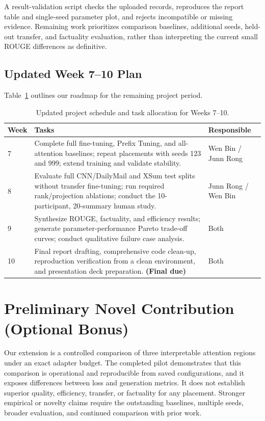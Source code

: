 \documentclass[11pt, letterpaper]{article}
\begin{document}
A result-validation script checks the uploaded records, reproduces the report
table and single-seed parameter plot, and rejects incompatible or missing evidence.
Remaining work prioritizes comparison baselines, additional seeds, held-out
transfer, and factuality evaluation, rather than interpreting the current small
ROUGE differences as definitive.

\subsection{Updated Week 7--10 Plan}
Table~\ref{tab:timeline} outlines our roadmap for the remaining project period.

\begin{table}[h]
\centering
\small
\begin{tabular}{@{}lp{8.8cm}l@{}}
\toprule
\textbf{Week} & \textbf{Tasks} & \textbf{Responsible} \\
\midrule
7 & Complete full fine-tuning, Prefix Tuning, and all-attention baselines; repeat placements with seeds 123 and 999; extend training and validate stability. & Wen Bin / Junn Rong \\
8 & Evaluate full CNN/DailyMail and XSum test splits without transfer fine-tuning; run required rank/projection ablations; conduct the 10-participant, 20-summary human study. & Junn Rong / Wen Bin \\
9 & Synthesize ROUGE, factuality, and efficiency results; generate parameter-performance Pareto trade-off curves; conduct qualitative failure case analysis. & Both \\
10 & Final report drafting, comprehensive code clean-up, reproduction verification from a clean environment, and presentation deck preparation. \textbf{(Final due)} & Both \\
\bottomrule
\end{tabular}
\caption{Updated project schedule and task allocation for Weeks 7--10.}
\label{tab:timeline}
\end{table}

\section{Preliminary Novel Contribution (Optional Bonus)}
Our extension is a controlled comparison of three interpretable attention regions
under an exact adapter budget. The completed pilot demonstrates that this comparison
is operational and reproducible from saved configurations, and it exposes differences
between loss and generation metrics. It does not establish superior quality,
efficiency, transfer, or factuality for any placement. Stronger empirical or novelty
claims require the outstanding baselines, multiple seeds, broader evaluation,
and continued comparison with prior work.
\end{document}
